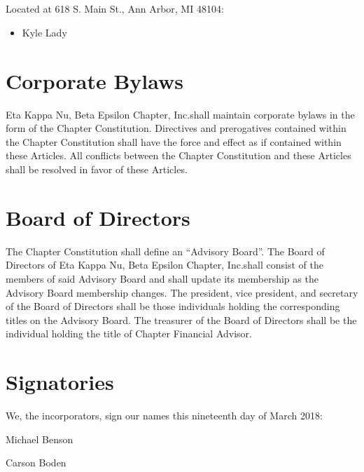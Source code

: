 \documentclass[incorporation,proposal,withoutpreface,withoutoptional,11pt,final]{bylaws}
\begin{document}
\section{} Located at 618 S. Main St., Ann Arbor, MI 48104:
\begin{itemize}
	\item Kyle Lady
\end{itemize}

\chapter{Corporate Bylaws}
Eta Kappa Nu, Beta Epsilon Chapter, Inc.\@ shall maintain corporate bylaws in the form of the Chapter Constitution. 
Directives and prerogatives contained within the Chapter Constitution shall have the force and effect as if contained within these Articles.
All conflicts between the Chapter Constitution and these Articles shall be resolved in favor of these Articles.

\chapter{Board of Directors}
The Chapter Constitution shall define an ``Advisory Board''. 
The Board of Directors of Eta Kappa Nu, Beta Epsilon Chapter, Inc.\@ shall consist of the members of said Advisory Board and shall update its membership as the Advisory Board membership changes.
The president, vice president, and secretary of the Board of Directors shall be those individuals holding the corresponding titles on the Advisory Board.
The treasurer of the Board of Directors shall be the individual holding the title of Chapter Financial Advisor.                                                                                                                                                                                                                  

\newpage
\chapter*{Signatories} 

We, the incorporators, sign our names this nineteenth day of March 2018:
\vspace{0.5in}

\vspace{0.5in}
\noindent Michael Benson

\vspace{0.5in}
\noindent Carson Boden
\end{document}
